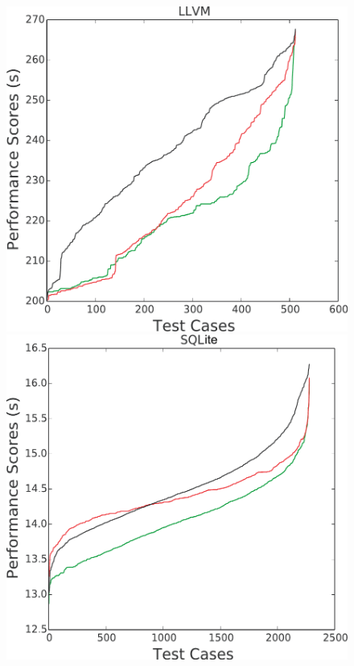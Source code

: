 \documentclass[conference]{IEEEtran}
\begin{document}
\begin{figure}[htbp!]
\begin{minipage}{0.30\linewidth}
\includegraphics[width=\linewidth]{figs/LLVM.pdf}
\end{minipage}
\begin{minipage}{0.30\linewidth}
\includegraphics[width=\linewidth]{figs/SQL.pdf}

\end{minipage}
\end{figure}
\end{document}
